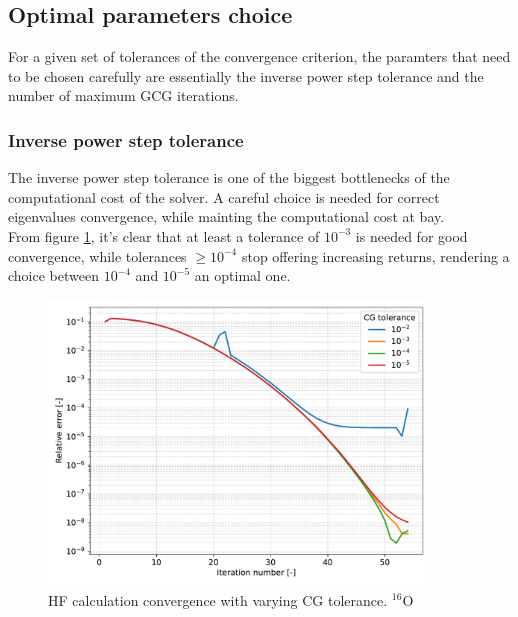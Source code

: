 \subsection{Optimal parameters choice}
For a given set of tolerances of the convergence criterion, the paramters that need to be chosen carefully are essentially the inverse power step tolerance and the number of maximum GCG iterations.
\subsubsection{Inverse power step tolerance}
The inverse power step tolerance is one of the biggest bottlenecks of the computational cost of the solver. A careful choice is needed for correct eigenvalues convergence, while mainting the computational cost at bay.
\\From figure \ref{fig:conv_tol}, it's clear that at least a tolerance of $10^{-3}$ is needed for good convergence, while tolerances $\ge 10^{-4}$ stop offering increasing returns, rendering a choice between $10^{-4}$ and $10^{-5}$ an optimal one.
\begin{figure}[H]
    \centering
    \includegraphics[width=0.9\textwidth]{Images/conv_tol.pdf}
    \caption{HF calculation convergence with varying CG tolerance. $^{16}$O}
    \label{fig:conv_tol}
\end{figure}
